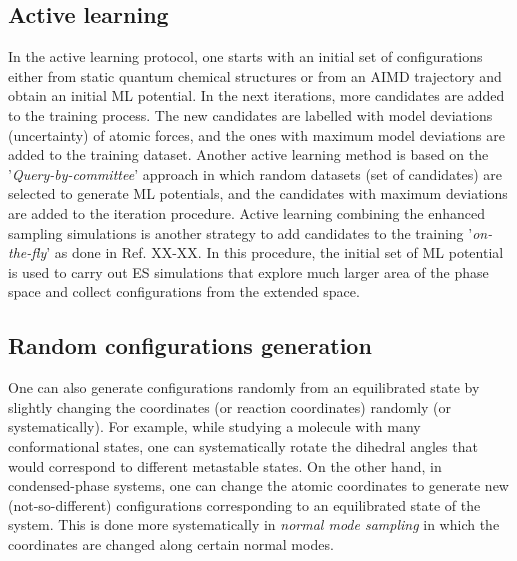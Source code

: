 \documentclass[9pt,bestpractices]{livecoms}
\begin{document}




\subsection{Active learning}
In the active learning protocol, one starts with an initial set of configurations either from static quantum chemical structures or from an AIMD trajectory and obtain an initial ML potential. In the next iterations, more candidates are added to the training process. The new candidates are labelled with model deviations (uncertainty) of atomic forces, and the ones with maximum model deviations are added to the training dataset. Another active learning method is based on the '{\em Query-by-committee}' approach in which random datasets (set of candidates) are selected to generate ML potentials, and the candidates with maximum deviations are added to the iteration procedure. Active learning combining the enhanced sampling simulations is another strategy to add candidates to the training '{\em on-the-fly}' as done in Ref. XX-XX. In this procedure, the initial set of ML potential is used to carry out ES simulations that explore much larger area of the phase space and collect configurations from the extended space. 






\subsection{Random configurations generation}
One can also generate configurations randomly from an equilibrated state by slightly changing the coordinates (or reaction coordinates) randomly (or systematically). For example, while studying a molecule with many conformational states, one can systematically rotate the dihedral angles that would correspond to different metastable states. On the other hand, in condensed-phase systems, one can change the atomic coordinates to generate new (not-so-different) configurations corresponding to an equilibrated state of the system. This is done more systematically in {\em normal mode sampling} in which the coordinates are changed along certain normal modes. 
\end{document}

